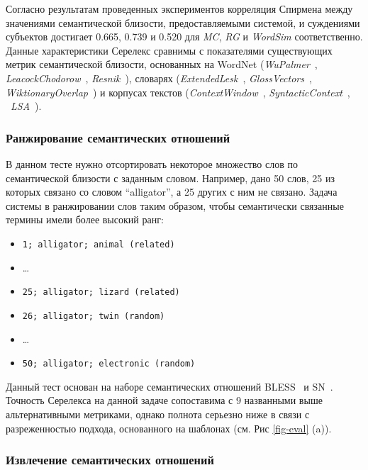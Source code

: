\documentclass[a4paper,10pt,twoside]{article}
\begin{document}
 Согласно результатам проведенных экспериментов корреляция Спирмена между значениями семантической близости, предоставляемыми системой, и суждениями субъектов достигает 
0.665, 0.739 и 0.520 для \textit{MC}, \textit{RG} и \textit{WordSim} соответственно. Данные характеристики Серелекс сравнимы с показателями существующих метрик семантической близости, основанных на WordNet (\textit{WuPalmer}~\cite{wu1994verbs}, \textit{LeacockChodorow}~\cite{leacock1998}, \textit{Resnik}~\cite{resnik1995}), словарях (\textit{ExtendedLesk}~\cite{banerjee2003extended}, \textit{GlossVectors}~\cite{patwardhan2006using}, \textit{WiktionaryOverlap}~\cite{zesch2008extracting}) и  корпусах текстов (\textit{ContextWindow}~\cite{cruys2010mining}, \textit{SyntacticContext}~\cite{cruys2010mining}, ~\textit{LSA}~\cite{landauer1998introduction}).

\subsubsection{Ранжирование семантических отношений}

В данном тесте нужно отсортировать некоторое множество слов по семантической близости с заданным словом. Например, дано 50 слов, 25 из которых связано со словом ``alligator'', а 25 других с ним не связано. Задача системы в ранжировании слов таким образом, чтобы семантически связанные термины имели более высокий ранг:

\begin{itemize}
\footnotesize
\item \texttt{1; alligator; animal (related)}
\item \ldots
\item \texttt{25; alligator; lizard (related)}
\item \texttt{26; alligator; twin (random)}
\item \ldots
\item \texttt{50; alligator; electronic (random) }
\end{itemize}

Данный тест основан на наборе семантических отношений BLESS~\cite{baroniwe} и SN~\cite{panchenko2012study}. Точность Серелекса на данной задаче сопоставима с 9 названными выше альтернативными метриками, однако полнота серьезно ниже в связи с разреженностью подхода, основанного на шаблонах (см. Рис \ref{fig-eval} (a)).

\subsubsection{Извлечение семантических отношений} 
\end{document}
